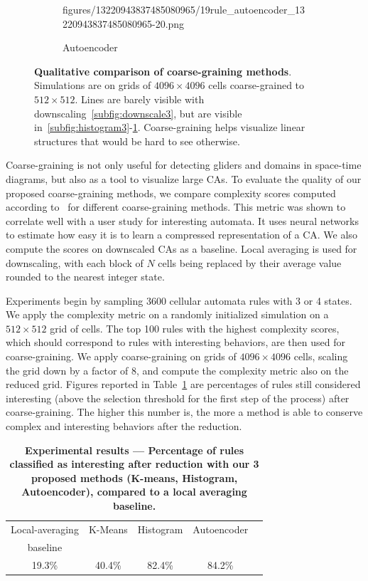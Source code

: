 \begin{figure}[th]
\begin{subfigure}{.48\linewidth}
{    {figures/13220943837485080965/19rule_autoencoder_13220943837485080965-20.png}}
    \caption{\label{subfig:autoencoder3}Autoencoder}
  \end{subfigure}
  \caption{\label{fig:qualitative}\textbf{Qualitative comparison of
      coarse-graining methods}. Simulations are on grids of $4096 \times 4096$
    cells coarse-grained to $512 \times 512$. Lines are barely visible with
    downscaling~\ref{subfig:downscale3}, but are visible
    in~\ref{subfig:histogram3}-\ref{subfig:autoencoder3}. Coarse-graining helps
    visualize linear structures that would be hard to see otherwise.}
\end{figure}

Coarse-graining is not only useful for detecting gliders and domains in
space-time diagrams, but also as a tool to visualize large CAs. To evaluate the
quality of our proposed coarse-graining methods, we compare complexity scores
computed according to~\cite{cisnerosEvolvingStructuresComplex2019} for different
coarse-graining methods. This metric was shown to correlate well with a user
study for interesting automata. It uses neural networks to estimate how easy it
is to learn a compressed representation of a CA\@. We also compute the scores on
downscaled CAs as a baseline. Local averaging is used for downscaling, with each
block of $N$ cells being replaced by their average value rounded to the nearest
integer state.

Experiments begin by sampling 3600 cellular automata rules with 3 or 4 states.
We apply the complexity metric on a randomly initialized simulation on a $512
\times 512$ grid of cells. The top 100 rules with the highest complexity scores,
which should correspond to rules with interesting behaviors, are then used for
coarse-graining. We apply coarse-graining on grids of $4096 \times 4096$ cells,
scaling the grid down by a factor of $8$, and compute the complexity metric also
on the reduced grid. Figures reported in Table~\ref{experiments_table} are
percentages of rules still considered interesting (above the selection threshold
for the first step of the process) after coarse-graining. The higher this number
is, the more a method is able to conserve complex and interesting behaviors
after the reduction.

\begin{table}[t!]
  \centering
  \begin{tabular}{ccccc}
    \toprule
       Local-averaging & K-Means & Histogram & Autoencoder\\
     baseline &  & & \\
    \midrule
      19.3\%  & 40.4\% & 82.4\% & 84.2\%\\
    \bottomrule
  \end{tabular}
  \caption{\label{experiments_table}\textbf{Experimental results --- Percentage
      of rules classified as interesting after reduction with our 3 proposed
      methods (K-means, Histogram, Autoencoder), compared to a local averaging baseline.}}
\end{table}

